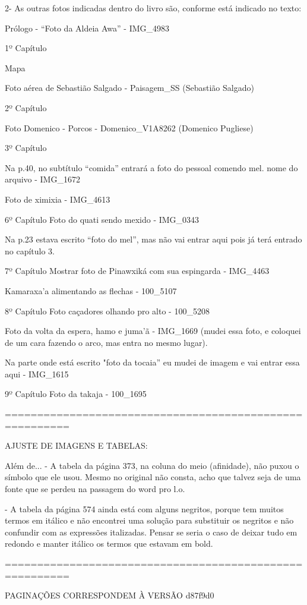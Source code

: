 2- As outras fotos indicadas dentro do livro são, conforme está indicado no texto:

Prólogo - “Foto da Aldeia Awa”  - IMG_4983


1º Capítulo

Mapa

Foto aérea de Sebastião Salgado - Paisagem_SS (Sebastião Salgado)


2º Capítulo

Foto Domenico - Porcos - Domenico_V1A8262 (Domenico Pugliese)


3º Capítulo

Na p.40, no subtítulo “comida” entrará a foto do pessoal comendo mel. nome do arquivo - IMG_1672

Foto de ximixia - IMG_4613


6º Capítulo
Foto do quati sendo mexido - IMG_0343

Na p.23 estava escrito “foto do mel”, mas não vai entrar aqui pois já terá entrado no capítulo 3.


7º Capítulo
Mostrar foto de Pinawxiká com sua espingarda - IMG_4463

Kamaraxa’a alimentando as flechas - 100_5107


8º Capítulo
Foto caçadores olhando pro alto - 100_5208

Foto da volta da espera, hamo e juma’ã - IMG_1669 (mudei essa foto, e coloquei de um cara fazendo o arco, mas entra no mesmo lugar).

Na parte onde está escrito "foto da tocaia” eu mudei de imagem e vai entrar essa aqui - IMG_1615


9º Capítulo
Foto da takaja - 100_1695

========================================================

AJUSTE DE IMAGENS E TABELAS:

Além de...
- A tabela da página 373, na coluna do meio (afinidade), não puxou o símbolo que ele usou. Mesmo no original não consta, acho que talvez seja de uma fonte que se perdeu na passagem do word pro l.o.

- A tabela da página 574 ainda está com alguns negritos, porque tem muitos termos em itálico e não encontrei uma solução para substituir os negritos e não confundir com as expressões italizadas. Pensar se seria o caso de deixar tudo em redondo e manter itálico os termos que estavam em bold.

========================================================

PAGINAÇÕES CORRESPONDEM À VERSÃO d87f9d0

